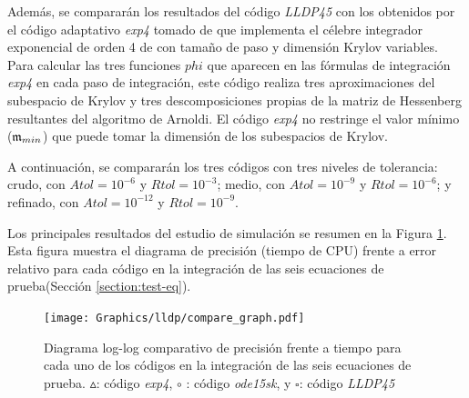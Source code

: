 Además, se compararán los resultados del código \emph{LLDP45} con los obtenidos por el código adaptativo \emph{exp4} tomado de \cite{jansing2011expode} que implementa el célebre integrador exponencial de orden 4 de \cite{hochbruck1998exponential} con tamaño de paso y dimensión Krylov variables. Para calcular las tres funciones $phi$ que aparecen en las fórmulas de integración \emph{exp4} en cada paso de integración, este código realiza tres aproximaciones del subespacio de Krylov y tres descomposiciones propias de la matriz de Hessenberg resultantes del algoritmo de Arnoldi. El código \emph{exp4} no restringe el
valor mínimo ($\mathfrak{m}_{min}$) que puede tomar la dimensión de los subespacios de Krylov.

A continuación, se compararán los tres códigos con tres niveles de tolerancia: crudo, con $ Atol = 10^{-6}$ y $Rtol = 10^{-3}$; medio, con $Atol = 10^{-9}$ y $Rtol = 10^{-6}$; y refinado, con $ Atol = 10^{-12}$ y $Rtol = 10^{-9}$.

Los principales resultados del estudio de simulación se resumen en la Figura \ref{num-exp-lldp-var-step:Fig1}. Esta figura muestra el diagrama de precisión (tiempo de CPU) frente a error relativo para cada código en la integración de las seis ecuaciones de prueba(Sección \ref{section:test-eq}).

\begin{figure}
	\begin{center}
    \hspace{-0.5in}
	\texttt{[image: Graphics/lldp/compare\_graph.pdf]}
	\vspace{-0.75in}
	\caption{ Diagrama log-log comparativo de precisión frente a tiempo para cada uno de los códigos en la integración de las seis ecuaciones de prueba. $\vartriangle$: código \emph{exp4}, $\circ$ : código \emph{ode15sk}, y $\square$: código \emph{LLDP45}}
	\label{num-exp-lldp-var-step:Fig1}
	\end{center}
\end{figure}

